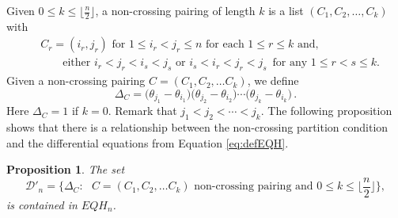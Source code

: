 \documentclass[11pt]{amsart}
\newtheorem{prop}[theorem]{Proposition}
\theoremstyle{definition}
\numberwithin{equation}{section}
\begin{document}
Given $0\le k\le \lfloor \frac{n}{2}\rfloor$, a non-crossing pairing of length $k$ is a
list $(C_1, C_2, \ldots, C_k)$ with
\begin{align*}
 &C_r=(i_r,j_r) \text{ for $1\le i_r<j_r\le n$ for each $1 \leq r \leq k$ and,}\\
 &\qquad \text{either } i_r<j_r<i_s<j_s  \text{ or }  i_s<i_r<j_r<j_s\,\text{ for any $1\le r<s\le k$}. 
\end{align*}
Given a non-crossing pairing $C=(C_1,C_2,\ldots C_k)$, we define
\begin{equation}\label{eq:Deltadef}
\Delta_C = \big(\theta_{j_1}-\theta_{i_1}\big)\big(\theta_{j_2}-\theta_{i_2}\big)\cdots \big(\theta_{j_k}-\theta_{i_k}\big)\,.
\end{equation}
Here $\Delta_C=1$ if $k=0$. Remark that $j_1<j_2<\cdots< j_k$.
The following proposition shows that there is a relationship between the non-crossing
partition condition and the differential equations from Equation \eqref{eq:defEQH}.

\begin{prop}\label{prop:harmelem}
The set
$${\mathcal D}'_n =\big\{ \Delta_C: \text{ $C=(C_1,C_2,\ldots C_k)$  non-crossing pairing and $0\le k\le \lfloor \frac{n}{2}\rfloor$}\big\},
$$
is contained in $EQH_n $.
\end{prop}
\end{document}
